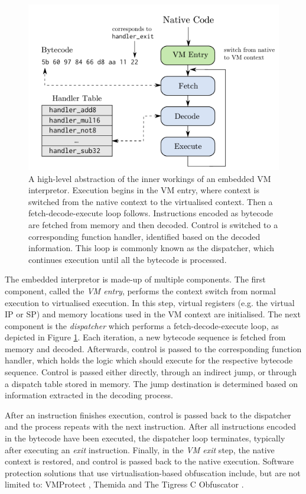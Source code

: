 \begin{figure}[ht]
    \centering
    \includegraphics[width=.7\textwidth]{./images/dispatch}
    \caption{A high-level abstraction of the inner workings of an embedded \gls{VM} interpretor. Execution begins in the VM entry, where context is switched from the native context to the virtualised context. Then a fetch-decode-execute loop follows. Instructions encoded as bytecode are fetched from memory and then decoded. Control is switched to a corresponding function handler, identified based on the decoded information. This loop is commonly known as the dispatcher, which continues execution until all the bytecode is processed. \cite{blazytko2017}}
    \label{fig:dispatch}
\end{figure}

The embedded interpretor is made-up of multiple components. The first component, called the \emph{\gls{VM} entry}, performs the context switch from normal execution to virtualised execution. In this step, virtual registers (e.g. the virtual \gls{IP} or \gls{SP}) and memory locations used in the \gls{VM} context are initialised. The next component is the \emph{dispatcher} which performs a fetch-decode-execute loop, as depicted in Figure \ref{fig:dispatch}. Each iteration, a new bytecode sequence is fetched from memory and decoded. Afterwards, control is passed to the corresponding function handler, which holds the logic which should execute for the respective bytecode sequence. Control is passed either directly, through an indirect jump, or through a dispatch table stored in memory. The jump destination is determined based on information extracted in the decoding process. 

After an instruction finishes execution, control is passed back to the dispatcher and the process repeats with the next instruction. After all instructions encoded in the bytecode have been executed, the dispatcher loop terminates, typically after executing an \emph{exit} instruction. Finally, in the \emph{VM exit} step, the native context is restored, and control is passed back to the native execution. Software protection solutions that use virtualisation-based obfuscation include, but are not limited to: VMProtect \cite{vmprotect}, Themida \cite{themida} and The Tigress C Obfuscator \cite{tigress}. 

